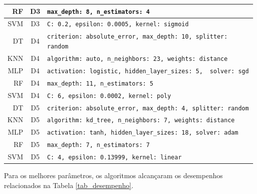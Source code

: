\documentclass[12pt]{article}
\begin{document}
\begin{table}[h!]
\begin{center}
\begin{tabular}{r|c|l}
      RF                  & D3                     & \scriptsize{\verb=max_depth: 8, n_estimators: 4=} \\ \hline
      SVM                 & D3                     & \scriptsize{\verb=C: 0.2, epsilon: 0.0005, kernel: sigmoid=} \\ \hline
      DT                  & D4                     & \scriptsize{\verb=criterion: absolute_error, max_depth: 10, splitter: random=} \\ \hline
      KNN                 & D4                     & \scriptsize{\verb=algorithm: auto, n_neighbors: 23, weights: distance=} \\ \hline
      MLP                 & D4                     & \scriptsize{\verb=activation: logistic, hidden_layer_sizes: 5,  solver: sgd=} \\ \hline
      RF                  & D4                     & \scriptsize{\verb=max_depth: 11, n_estimators: 5=} \\ \hline
      SVM                 & D4                     & \scriptsize{\verb=C: 6, epsilon: 0.0002, kernel: poly=} \\ \hline
      DT                  & D5                     & \scriptsize{\verb=criterion: absolute_error, max_depth: 4, splitter: random=} \\ \hline
      KNN                 & D5                     & \scriptsize{\verb=algorithm: kd_tree, n_neighbors: 7, weights: distance=} \\ \hline
      MLP                 & D5                     & \scriptsize{\verb=activation: tanh, hidden_layer_sizes: 18, solver: adam=} \\ \hline
      RF                  & D5                     & \scriptsize{\verb=max_depth: 7, n_estimators: 7=} \\ \hline
      SVM                 & D5                     & \scriptsize{\verb=C: 4, epsilon: 0.13999, kernel: linear=} \\ \hline
    \end{tabular}
  \end{center}
\end{table}

Para os melhores parâmetros, os algoritmos alcançaram os desempenhos relacionados na Tabela \ref{tab_desempenho}.
\end{document}
